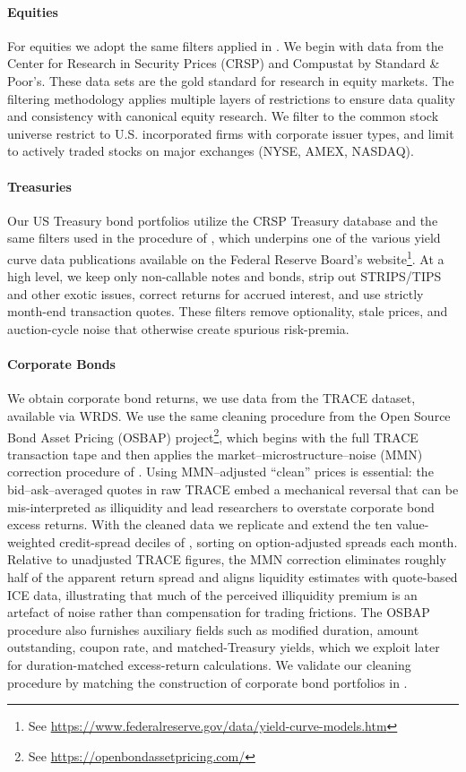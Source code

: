 \documentclass{article}
\begin{document}
\paragraph{Equities}
For equities we adopt the same filters applied in \cite{Fama1993}. We begin with data from the Center for Research in Security Prices (CRSP) and Compustat by Standard \& Poor's. These data sets are the gold standard for research in equity markets. The filtering methodology applies multiple layers of restrictions to ensure data quality and consistency with canonical equity research. We filter to the common stock universe restrict to U.S. incorporated firms with corporate issuer types, and limit to actively traded stocks on major exchanges (NYSE, AMEX, NASDAQ).


\paragraph{Treasuries} 
Our US Treasury bond portfolios utilize the CRSP Treasury database and the same filters used in the procedure of  \cite{Gurkaynak2007}, which underpins one of the
various yield curve data publications available on the Federal Reserve Board's website\footnote{See \url{https://www.federalreserve.gov/data/yield-curve-models.htm}}. At a high level, we keep only non-callable notes and bonds, strip out STRIPS/TIPS and other exotic issues, correct returns for accrued interest, and use strictly month-end transaction quotes. These filters remove optionality, stale prices, and auction-cycle noise that otherwise create spurious risk-premia. 


\paragraph{Corporate Bonds}
We obtain corporate bond returns, we use data from the TRACE dataset, available via WRDS. We use the same cleaning procedure from the Open Source Bond Asset Pricing (OSBAP) project\footnote{See \url{https://openbondassetpricing.com/}}, which begins with the full TRACE transaction tape and then applies the market--microstructure--noise (MMN) correction procedure of \citet{Dickerson2024}.  Using MMN--adjusted ``clean'' prices is essential: the bid--ask--averaged quotes in raw TRACE embed a mechanical reversal that can be mis-interpreted as illiquidity and lead researchers to overstate corporate bond excess returns.  With the cleaned data we replicate and extend the ten value-weighted credit-spread deciles of \citet{Nozawa2017}, sorting on option-adjusted spreads each month.  Relative to unadjusted TRACE figures, the MMN correction eliminates roughly half of the apparent return spread and aligns liquidity estimates with quote-based ICE data, illustrating that much of the perceived illiquidity premium is an artefact of noise rather than compensation for trading frictions. The OSBAP procedure also furnishes auxiliary fields such as modified duration, amount outstanding, coupon rate, and matched-Treasury yields, which we exploit later for duration-matched excess-return calculations. We validate our cleaning procedure by matching the construction of corporate bond portfolios in \cite{He2017}.
\end{document}
